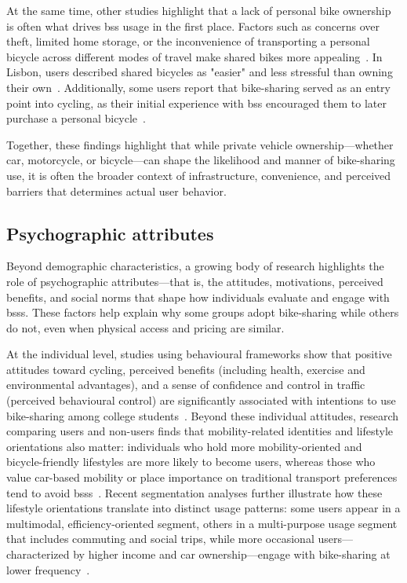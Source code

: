     At the same time, other studies highlight that a lack of personal bike ownership is often what drives \ac{bss} usage in the first place. Factors such as concerns over theft, limited home storage, or the inconvenience of transporting a personal bicycle across different modes of travel make shared bikes more appealing~\cite{Teixeira2023, Ricci2015, Molina-Garcia2013, BachandMarleau2012}. In Lisbon, users described shared bicycles as "easier" and less stressful than owning their own~\cite{Teixeira2023}. Additionally, some users report that bike-sharing served as an entry point into cycling, as their initial experience with \ac{bss} encouraged them to later purchase a personal bicycle~\cite{Fishman2016}.

    Together, these findings highlight that while private vehicle ownership—whether car, motorcycle, or bicycle—can shape the likelihood and manner of bike-sharing use, it is often the broader context of infrastructure, convenience, and perceived barriers that determines actual user behavior.

    \subsection{Psychographic attributes}

    Beyond demographic characteristics, a growing body of research highlights the role of psychographic attributes—that is, the attitudes, motivations, perceived benefits, and social norms that shape how individuals evaluate and engage with \acp{bss}. These factors help explain why some groups adopt bike-sharing while others do not, even when physical access and pricing are similar.

    At the individual level, studies using behavioural frameworks show that positive attitudes toward cycling, perceived benefits (including health, exercise and environmental advantages), and a sense of confidence and control in traffic (perceived behavioural control) are significantly associated with intentions to use bike-sharing among college students~\cite{Chen2022_Predicting}. Beyond these individual attitudes, research comparing users and non-users finds that mobility-related identities and lifestyle orientations also matter: individuals who hold more mobility-oriented and bicycle-friendly lifestyles are more likely to become users, whereas those who value car-based mobility or place importance on traditional transport preferences tend to avoid \acp{bss}~\cite{Stockle2020}. Recent segmentation analyses further illustrate how these lifestyle orientations translate into distinct usage patterns: some users appear in a multimodal, efficiency-oriented segment, others in a multi-purpose usage segment that includes commuting and social trips, while more occasional users—characterized by higher income and car ownership—engage with bike-sharing at lower frequency~\cite{Mohiuddin2024}.

